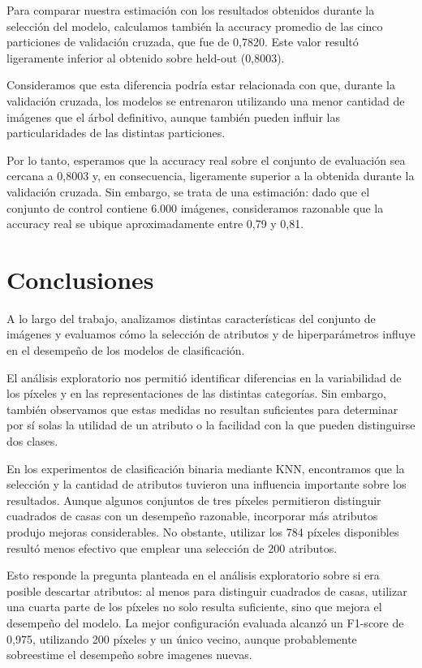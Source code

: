 \documentclass[11pt,a4paper]{article}
\begin{document}
Para comparar nuestra estimación con los resultados
obtenidos durante la selección del modelo, calculamos
también la accuracy promedio de las cinco particiones
de validación cruzada, que fue de 0,7820. Este valor
resultó ligeramente inferior al obtenido sobre
held-out (0,8003).

Consideramos que esta diferencia podría estar
relacionada con que, durante la validación cruzada,
los modelos se entrenaron utilizando una menor
cantidad de imágenes que el árbol definitivo,
aunque también pueden influir las particularidades
de las distintas particiones.

Por lo tanto, esperamos que la accuracy real
sobre el conjunto de evaluación
sea cercana a 0,8003 y, en consecuencia,
ligeramente superior a la obtenida durante
la validación cruzada. Sin embargo, se trata de una 
estimación: dado que el conjunto de control contiene 
6.000 imágenes, consideramos razonable que 
la accuracy real se ubique aproximadamente 
entre 0,79 y 0,81.


\section{Conclusiones}

A lo largo del trabajo, analizamos distintas
características del conjunto de imágenes y evaluamos
cómo la selección de atributos y de hiperparámetros
influye en el desempeño de los modelos de clasificación.

El análisis exploratorio nos permitió identificar
diferencias en la variabilidad de los píxeles y en
las representaciones de las distintas categorías.
Sin embargo, también observamos que estas medidas
no resultan suficientes para determinar por sí solas
la utilidad de un atributo o la facilidad con la
que pueden distinguirse dos clases.

En los experimentos de clasificación binaria mediante
KNN, encontramos que la selección y la cantidad de
atributos tuvieron una influencia importante sobre
los resultados. Aunque algunos conjuntos de tres
píxeles permitieron distinguir cuadrados de casas
con un desempeño razonable, incorporar más atributos
produjo mejoras considerables. No obstante, utilizar
los 784 píxeles disponibles resultó menos efectivo
que emplear una selección de 200 atributos.

Esto responde la pregunta planteada en el análisis
 exploratorio  sobre si era posible descartar atributos: 
al menos  para distinguir cuadrados de casas, utilizar 
una cuarta parte  de los píxeles no solo resulta suficiente, 
sino que mejora el desempeño del modelo.
La mejor configuración evaluada alcanzó un F1-score
de 0,975, utilizando 200 píxeles y un único vecino,
aunque probablemente sobreestime el desempeño
sobre imagenes nuevas. 
\end{document}
